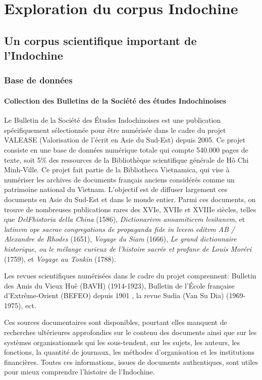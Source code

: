 \part{Exploration du corpus Indochine}

\chapter{Un corpus scientifique important de l'Indochine}

\section{Base de données}

\subsection{Collection des Bulletins de la Société des études Indochinoises}

Le Bulletin de la Société des Études Indochinoises est une publication spécifiquement sélectionnée pour être numérisée dans le cadre du projet VALEASE (Valorisation de l'écrit en Asie du Sud-Est) depuis 2005. Ce projet consiste en une base de données numérique totale qui compte 540.000 pages de texte, soit 5\% des ressources de la Bibliothèque scientifique générale de Hô Chi Minh-Ville. Ce projet fait partie de la Bibliotheca Vietnamica, qui vise à numériser les archives de documents français anciens considérés comme un patrimoine national du Vietnam. L'objectif est de diffuser largement ces documents en Asie du Sud-Est et dans le monde entier. Parmi ces documents, on trouve de nombreuses publications rares des XVIe, XVIIe et XVIIIe siècles, telles que \textit{DelFhistoria della China} (1586), \textit{Dictionarivm annamiticvm lvsitanvm}, et \textit{latinvm ope sacrae congregations de propaganda fide in lvcem editvm AB / Alexandre de Rhodes} (1651), \textit{Voyage du Siam} (1666), \textit{Le grand dictionnaire historique, ou le mélange curieux de l'histoire sacrée et profane de Louis Moréri} (1759), et \textit{Voyage au Tonkin} (1788).

Les revues scientifiques numérisées dans le cadre du projet comprennent: Bulletin des Amis du Vieux Huê (BAVH) (1914-1923), Bulletin de l'École française d'Extrême-Orient (BEFEO) depuis 1901 , la revue Sudia (Van Su Dia) (1969-1975), ect.

Ces sources documentaires sont disponibles, pourtant elles manquent de recherches ultérieures approfondies sur le contenu des documents ainsi que sur les systèmes organisationnels qui les sous-tendent, sur les sujets, les auteurs, les fonctions, la quantité de journaux, les méthodes d'organisation et les institutions financières. Toutes ces informations, issues de documents authentiques, sont utiles pour mieux comprendre l’histoire de l’Indochine.

